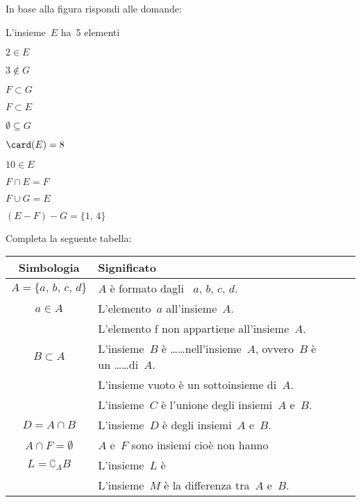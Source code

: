 \begin{esercizio}
\label{ese:5.114}
In base alla figura rispondi alle domande:
\begin{multicols}{2}
\TabPositions{4.5cm}
\begin{enumeratea}
\item L'insieme~$E$ ha~5 elementi \tab\boxV\quad\boxF
\item $2\in E$ \tab\boxV\quad\boxF
\item $3\notin G$ \tab\boxV\quad\boxF
\item $F\subset G$ \tab\boxV\quad\boxF
\item $F\subset E$ \tab\boxV\quad\boxF
\item $\emptyset \subseteq G$ \tab\boxV\quad\boxF
\item $\card(E)=8$ \tab\boxV\quad\boxF
\item $10\in E$ \tab\boxV\quad\boxF
\item $F\cap E=F$ \tab\boxV\quad\boxF
\item $F\cup G=E$ \tab\boxV\quad\boxF
\item $(E-F)-G=\{\text{1, 4}\}$ \tab\boxV\quad\boxF
\end{enumeratea}
\begin{center}
 
\end{center}
\end{multicols}
\end{esercizio}
\pagebreak
\begin{esercizio}
\label{ese:5.115}
Completa la seguente tabella:

\begin{tabular*}{.9\textwidth}{@{\extracolsep{\fill}}*{2}{cl}}
\toprule
Simbologia & Significato\\
\midrule
$A=\{a\text{, }b\text{, }c\text{, }d\}$ & $A$ è formato dagli \dotfill~$a\text{, }b\text{, }c\text{, }d$.\\
$a\in A$ & L'elemento~$a$ \dotfill all'insieme~$A$.\\
\dotfill & L'elemento f non appartiene all'insieme~$A$.\\
$B\subset A$ & L'insieme~$B$ è \ldots\ldots nell'insieme~$A$, ovvero~$B$ è un \ldots\ldots di~$A$.\\
\dotfill & L'insieme vuoto è un sottoinsieme di~$A$.\\
\dotfill & L'insieme~$C$ è l'unione degli insiemi~$A$ e~$B$.\\
$D=A\cap B$ & L'insieme~$D$ è \dotfill degli insiemi~$A$ e~$B$.\\
$A\cap F=\emptyset $& $A$ e~$F$ sono insiemi \dotfill cioè non hanno \dotfill \\
$L=\complement_{A}B$ & L'insieme~$L$ è \dotfill \\
\dotfill & L'insieme~$M$ è la differenza tra~$A$ e~$B$.\\
\bottomrule
\end{tabular*}
\end{esercizio}

